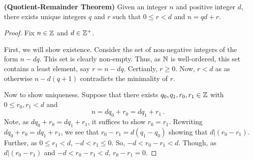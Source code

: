 \guard



\begin{thm}
\label{thm:quotientRemainderTheorem}
  \textbf{(Quotient-Remainder Theorem)}
  Given an integer $n$ and positive integer $d$, there exists unique integers $q$ and $r$ such that $0\leq r < d$ and $n=qd + r$.
\end{thm}
\begin{proof}
  Fix $n\in\mathbb{Z}$ and $d\in\mathbb{Z}^+$.

  First, we will show existence.
  Consider the set of non-negative integers of the form $n-dq$.
  This set is clearly non-empty.
  Thus, as $\mathbb{N}$ is well-ordered, this set contains a least element, say $r=n-dq$.
  Certianly, $r\geq 0$.
  Now, $r<d$ as as otherwise $n-d(q+1)$ contradicts the minimality of $r$.

  Now to show uniqueness.
  Suppose that there exists $q_0,q_1,r_0,r_1\in\mathbb{Z}$ with $0\leq r_0,r_1 <d$ and \[n=dq_0+r_0=dq_1+r_1\,.\]
  Note, as $dq_0+r_0=dq_1+r_1$, it suffices to show $r_0=r_1$.
  Rewriting $dq_0+r_0=dq_1+r_1$, we see that $r_0-r_1=d(q_1-q_0)$ showing that $d|(r_0-r_1)$.
  Further, as $0\leq r_1 <d$, $-d<r_1\leq 0$.
  So, $-d < r_0-r_1 <d$.
  Though, as $d|(r_0-r_1)$ and $-d < r_0-r_1 <d$, $r_0-r_1=0$.
\end{proof}
